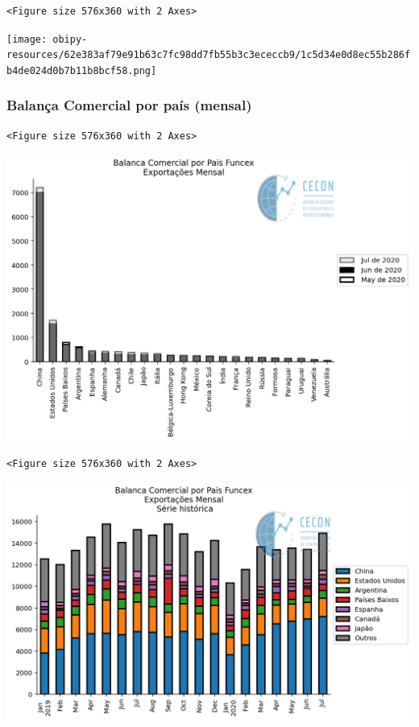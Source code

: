\documentclass[11pt]{article}
\begin{document}
\begin{verbatim}
<Figure size 576x360 with 2 Axes>
\end{verbatim}


\begin{center}
\texttt{[image: obipy-resources/62e383af79e91b63c7fc98dd7fb55b3c3ececcb9/1c5d34e0d8ec55b286fb4de024d0b7b11b8bcf58.png]}
\end{center}

\subsubsection{Balança Comercial por país (mensal)}
\label{sec:org29762e1}

\begin{verbatim}
<Figure size 576x360 with 2 Axes>
\end{verbatim}


\begin{center}
\includegraphics[width=.9\linewidth]{obipy-resources/62e383af79e91b63c7fc98dd7fb55b3c3ececcb9/c3ff075133f390045c0fb620ae17d0d8ae93f0b8.png}
\end{center}


\begin{verbatim}
<Figure size 576x360 with 2 Axes>
\end{verbatim}


\begin{center}
\includegraphics[width=.9\linewidth]{obipy-resources/62e383af79e91b63c7fc98dd7fb55b3c3ececcb9/94e3a318f5fa3b548791774e379fcc93c0ac6151.png}
\end{center}
\end{document}

